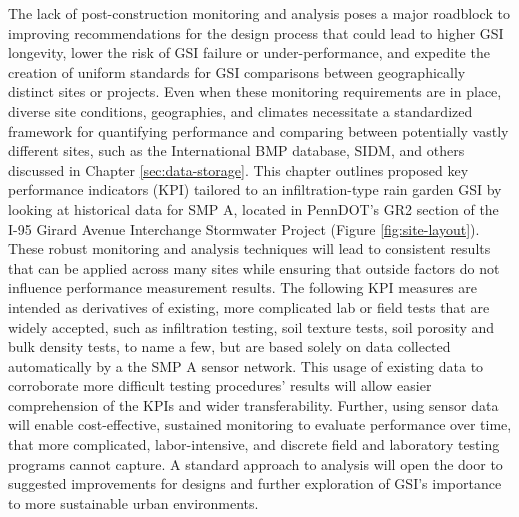 The lack of post-construction monitoring and analysis poses a major roadblock to improving recommendations for the design process that could lead to higher GSI longevity, lower the risk of GSI failure or under-performance, and expedite the creation of uniform standards for GSI comparisons between geographically distinct sites or projects. 
Even when these monitoring requirements are in place, diverse site conditions, geographies, and climates necessitate a standardized framework for quantifying performance and comparing between potentially vastly different sites, such as the International BMP database, SIDM, and others discussed in Chapter \ref{sec:data-storage}.
This chapter outlines proposed key performance indicators (KPI) tailored to an infiltration-type rain garden GSI by looking at historical data for SMP A, located in PennDOT's GR2 section of the I-95 Girard Avenue Interchange Stormwater Project (Figure \ref{fig:site-layout}).
These robust monitoring and analysis techniques will lead to consistent results that can be applied across many sites while ensuring that outside factors do not influence performance measurement results.
The following KPI measures are intended as derivatives of existing, more complicated lab or field tests that are widely accepted, such as infiltration testing, soil texture tests, soil porosity and bulk density tests, to name a few, but are based solely on data collected automatically by a the SMP A sensor network.
This usage of existing data to corroborate more difficult testing procedures' results will allow easier comprehension of the KPIs and wider transferability.
Further, using sensor data will enable cost-effective, sustained monitoring to evaluate performance over time, that more complicated, labor-intensive, and discrete field and laboratory testing programs cannot capture.
A standard approach to analysis will open the door to suggested improvements for designs and further exploration of GSI's importance to more sustainable urban environments.

